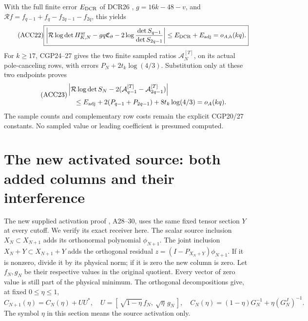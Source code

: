 \documentclass[11pt]{article}
\begin{document}
With the full finite error \(E_{\rm DCR}\) of DCR26 \cite{DCR},
\(g=16k-48-v\), and
\(\mathcal Rf=f_{q-1}+f_q-f_{2q-1}-f_{2q}\), this yields
\begin{equation}\tag{ACC22}
\boxed{\left|\mathcal R\log\det H_{K,N}^{\rm ar}
-gq\mathfrak C_\partial
-2\log\frac{\det S_{q-1}}{\det S_{2q-1}}\right|
\le E_{\rm DCR}+E_{\rm adj}=o_{A,h}(kq).}
\end{equation}
For \(k\ge17\), CGP24--27 \cite{CGP} gives the two finite sampled
ratios \(\mathcal A_N^{[T]}\), on its actual pole-canceling rows,
with errors \(P_N+2t_k\log(4/3)\).
Substitution only at these two endpoints proves
\begin{equation}\tag{ACC23}
\begin{aligned}
&\left|\mathcal R\log\det S_N
-2(\mathcal A_{q-1}^{[T]}-\mathcal A_{2q-1}^{[T]})\right|\\
&\quad\le E_{\rm adj}+2(P_{q-1}+P_{2q-1})+8t_k\log(4/3)=o_A(kq).
\end{aligned}
\end{equation}
The sample counts and complementary row costs remain the explicit
CGP20/27 constants. No sampled value or leading coefficient is
presumed computed.

\section{The new activated source: both added columns and their interference}
The new supplied activation proof \cite{Activation}, A28--30, uses the
same fixed tensor section \(Y\) at every cutoff. We verify its exact
receiver here. The scalar source inclusion \(X_N\subset X_{N+1}\)
adds its orthonormal polynomial \(\phi_{N+1}\).
The joint inclusion \(X_N+Y\subset X_{N+1}+Y\) adds the orthogonal
residual \(z=(I-P_{X_N+Y})\phi_{N+1}\). If it is nonzero, divide it
by its physical norm; if it is zero the new column is zero.
Let \(f_N,g_N\) be their respective values in the original quotient.
Every vector of zero value is still part of the physical minimum.
The orthogonal decompositions give, at fixed \(0\le\eta\le1\),
\begin{equation}\tag{ACC24}
C_{N+1}(\eta)=C_N(\eta)+UU^*,\quad
U=[\,\sqrt{1-\eta}\,f_N,\ \sqrt\eta\,g_N\,],\quad
C_N(\eta)=(1-\eta)G_N^{-1}+\eta(G_N^J)^{-1}.
\end{equation}
The symbol \(\eta\) in this section means the source activation only.
\end{document}
